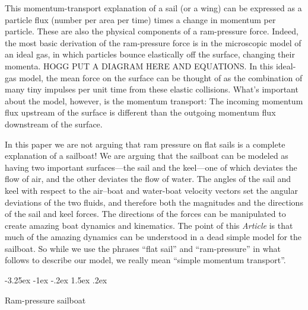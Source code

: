 \documentclass[letterpaper]{article}
\makeatletter
\newcommand{\documentname}{\textsl{Article}}
\renewcommand\section{\@startsection {section}{1}{\z@}%
  {-3.25ex \@plus -1ex \@minus -.2ex}%
  {1.5ex \@plus .2ex}%
  {\raggedright\normalfont\large\bfseries}}
\makeatother
\begin{document}
This momentum-transport explanation of a sail (or a wing) 
can be expressed as a particle flux (number per area per time) times a change in momentum per particle.
These are also the physical components of a ram-pressure force.
Indeed, the most basic derivation of the ram-pressure force is in the microscopic model of an ideal gas, in which particles bounce elastically off the surface, changing their momenta.
HOGG PUT A DIAGRAM HERE AND EQUATIONS.
In this ideal-gas model, the mean force on the surface can be thought of as the combination of many tiny impulses per unit time from these elastic collisions.
What's important about the model, however, is the momentum transport:
The incoming momentum flux upstream of the surface is different than the outgoing momentum flux downstream of the surface.

In this paper we are not arguing that ram pressure on flat sails is a complete explanation of a sailboat!
We are arguing that the sailboat can be modeled as having two important surfaces---the sail and the keel---one of which deviates the flow of air, and the other deviates the flow of water.
The angles of the sail and keel with respect to the air--boat and water-boat velocity vectors set the angular deviations of the two fluids, and therefore both the magnitudes and the directions of the sail and keel forces.
The directions of the forces can be manipulated to create amazing boat dynamics and kinematics.
The point of this \documentname{} is that much of the amazing dynamics can be understood in a dead simple model for the sailboat.
So while we use the phrases ``flat sail'' and ``ram-pressure'' in what follows to describe our model, we really mean ``simple momentum transport''.

\section{Ram-pressure sailboat}\label{sec:model}
\end{document}
